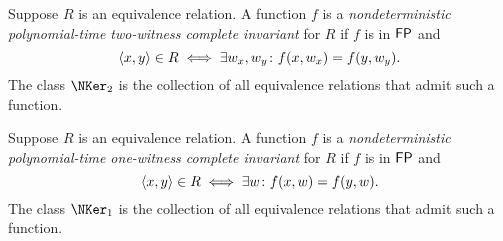 \begin{definition}\label{def:npeq7}
  Suppose $R$ is an equivalence relation.
  A function $f$ is a \emph{nondeterministic polynomial-time two-witness complete invariant} for $R$ if $f$ is in ${\mathsf{FP}}$ and
  \begin{displaymath}
    \langle x,y\rangle \in R \iff \exists w_x, w_y \colon f(x, w_x) = f(y, w_y).
  \end{displaymath}
  The class $\NKer_2$ is the collection of all equivalence relations that admit such a function.
\end{definition}

\begin{definition}\label{def:npeq8}
  Suppose $R$ is an equivalence relation.
  A function $f$ is a \emph{nondeterministic polynomial-time one-witness complete invariant} for $R$ if $f$ is in ${\mathsf{FP}}$ and
  \begin{displaymath}
    \langle x,y\rangle \in R \iff \exists w \colon f(x, w) = f(y, w).
  \end{displaymath}
  The class $\NKer_1$ is the collection of all equivalence relations that admit such a function.
\end{definition}

